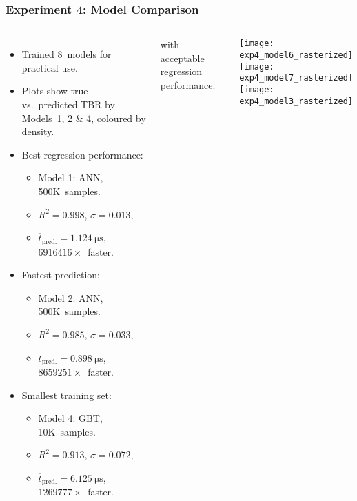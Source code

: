 \begin{frame}
	\frametitle{Experiment 4: Model Comparison}
	\begin{columns}
		\begin{itemize}
			\item
				Trained 8~models for practical use.
			\item
				Plots show true vs.~predicted TBR by Models~1, 2 \& 4,
				coloured by density.
			\item
				Best regression performance:
				\begin{itemize}
					\item
						Model 1: ANN, 500K~samples.
					\item
						$R^2=\num{0.998}$,
						$\sigma=\num{0.013}$,
					\item
						$\overline{t}_{\text{pred.}}=\SI{1.124}{\micro\second}$,
						$\num{6916416} \times$~faster.
				\end{itemize}
			\item
				Fastest prediction:\textsuperscript{\textdagger}
				\begin{itemize}
					\item
						Model 2: ANN, 500K~samples.
					\item
						$R^2=\num{0.985}$,
						$\sigma=\num{0.033}$,
					\item
						$\overline{t}_{\text{pred.}}=\SI{0.898}{\micro\second}$,
						$\num{8659251} \times$~faster.
				\end{itemize}
			\item
				Smallest training set:\textsuperscript{\textdagger}
				\begin{itemize}
					\item
						Model 4: GBT, 10K~samples.
					\item
						$R^2=\num{0.913}$,
						$\sigma=\num{0.072}$,
					\item
						$\overline{t}_{\text{pred.}}=\SI{6.125}{\micro\second}$,
						$\num{1269777} \times$~faster.
				\end{itemize}
		\end{itemize}

		{\footnotesize
			\textsuperscript{\textdagger}
			with acceptable regression performance.
		}

		\texttt{[image: exp4\_model6\_rasterized]}\vspace{-8pt}\\
		\texttt{[image: exp4\_model7\_rasterized]}\vspace{-8pt}\\
		\texttt{[image: exp4\_model3\_rasterized]}

	\end{columns}
\end{frame}

